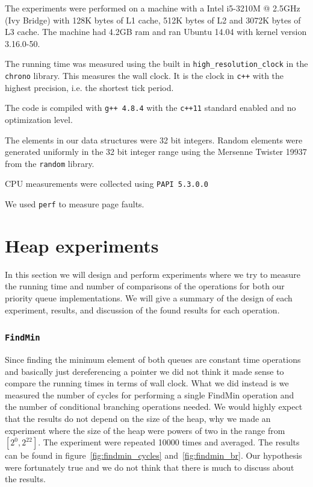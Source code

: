 \documentclass[a4paper,oneside,article,11pt]{memoir}
\begin{document}
The experiments were performed on a machine with a Intel i5-3210M @ 2.5GHz (Ivy Bridge) with 128K bytes of L1 cache, 512K bytes of L2 and 3072K bytes of L3 cache. The machine had 4.2GB ram and ran Ubuntu 14.04 with kernel version 3.16.0-50.

The running time was measured using the built in \texttt{high\_resolution\_clock} in the \texttt{chrono} library. This measures the wall clock. It is the clock in \texttt{c++} with the highest precision, i.e. the shortest tick period.

The code is compiled with \texttt{g++ 4.8.4} with the \texttt{c++11} standard enabled and no optimization level.

The elements in our data structures were 32 bit integers. Random elements were generated uniformly in the 32 bit integer range using the Mersenne Twister 19937 from the \texttt{random} library.

CPU measurements were collected using \texttt{PAPI 5.3.0.0}

We used \texttt{perf} to measure page faults.

\chapter{Heap experiments}
\label{heap_experiments}
In this section we will design and perform experiments where we try to measure the running time and number of comparisons of the operations for both our priority queue implementations. We will give a summary of the design of each experiment, results, and discussion of the found results for each operation.

\subsection{\texttt{FindMin}}
Since finding the minimum element of both queues are constant time operations and basically just dereferencing a pointer we did not think it made sense to compare the running times in terms of wall clock. What we did instead is we measured the number of cycles for performing a single FindMin operation and the number of conditional branching operations needed. We would highly expect that the results do not depend on the size of the heap, why we made an experiment where the size of the heap were powers of two in the range from $\left[2^0, 2^{22}\right]$. The experiment were repeated 10000 times and averaged. The results can be found in figure~\ref{fig:findmin_cycles} and~\ref{fig:findmin_br}.
Our hypothesis were fortunately true and we do not think that there is much to discuss about the results.
\end{document}
